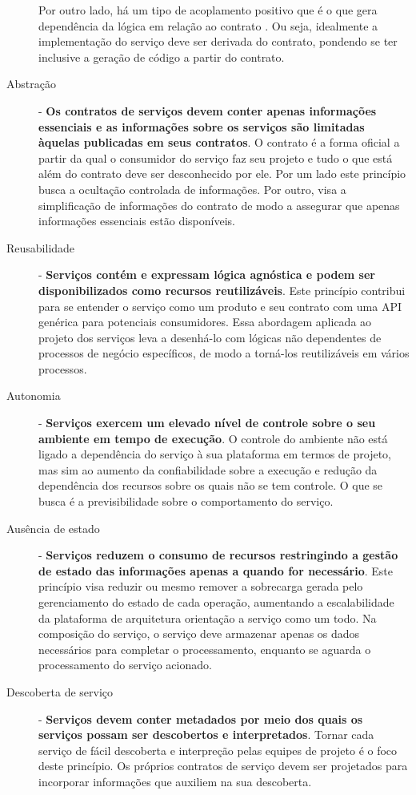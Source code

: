 \begin{description}
Por outro lado, há um tipo de acoplamento positivo que é o que gera dependência
da lógica em relação ao contrato \cite{erl2009web}. Ou seja, idealmente a
implementação do serviço deve ser derivada do contrato, pondendo se ter inclusive a geração de código a
partir do contrato.


\item[Abstração] - \textbf{Os contratos de serviços devem conter apenas
informações essenciais e as informações sobre os serviços são limitadas àquelas
publicadas em seus contratos}. O contrato é a forma oficial a partir da qual o
consumidor do serviço faz seu projeto e tudo o que está além do contrato deve
ser desconhecido por ele. Por um lado este princípio busca a ocultação
controlada de informações. Por outro, visa a simplificação de informações do
contrato de modo a assegurar que apenas informações essenciais estão
disponíveis.


\item[Reusabilidade]- \textbf{Serviços contém e expressam lógica agnóstica e
podem ser disponibilizados como recursos reutilizáveis}. Este princípio
contribui para se entender o serviço como um produto e seu contrato com uma API
genérica para potenciais consumidores. Essa abordagem aplicada ao projeto dos
serviços leva a desenhá-lo com lógicas não dependentes de processos de negócio
específicos, de modo a torná-los reutilizáveis em vários processos.

\item[Autonomia]- \textbf{Serviços exercem um elevado nível de controle sobre
o seu ambiente em tempo de execução}. O controle do ambiente não está ligado a
dependência do serviço à sua plataforma em termos de projeto, mas sim ao aumento
da confiabilidade sobre a execução e redução da dependência dos recursos
sobre os quais não se tem controle.
O que se busca é a previsibilidade sobre o comportamento do serviço.

\item[Ausência de estado] - \textbf{Serviços reduzem o consumo de recursos
restringindo a gestão de estado das informações apenas a quando for necessário}.
Este princípio visa reduzir ou mesmo remover a sobrecarga gerada pelo
gerenciamento do estado de cada operação, aumentando a escalabilidade da
plataforma de arquitetura orientação a serviço como um todo. Na composição do
serviço, o serviço deve armazenar apenas os dados necessários para completar o
processamento, enquanto se aguarda o processamento do serviço acionado.

\item[Descoberta de serviço] - \textbf{Serviços devem conter metadados por meio
dos quais os serviços possam ser descobertos e interpretados}. Tornar cada
serviço de fácil descoberta e interpreção pelas equipes de projeto é o foco
deste princípio. Os próprios contratos de serviço devem ser projetados para
incorporar informações que auxiliem na sua descoberta.


\end{description}
